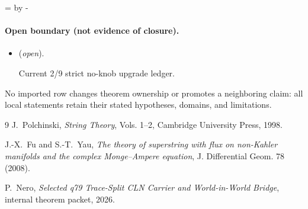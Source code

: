 \documentclass[11pt]{article}
\begin{document}
\par\begingroup{}=\pagegoal\advance{} by -\pagetotal\ifdim\dimen0<7\baselineskip\newpage\fi\endgroup
\paragraph{Open boundary (not evidence of closure).}
\begin{itemize}
\setlength{\itemsep}{0.25em}
\item {} (\emph{open}).\par Current 2/9 strict no-knob upgrade ledger.
\end{itemize}

No imported row changes theorem ownership or promotes a neighboring claim: all local statements retain their stated hypotheses, domains, and limitations.

\begin{thebibliography}{9}
J.~Polchinski, \emph{String Theory}, Vols. 1--2, Cambridge University Press,
1998.

J.-X.~Fu and S.-T.~Yau,
\emph{The theory of superstring with flux on non-Kahler manifolds and the
complex Monge--Ampere equation}, J. Differential Geom. 78 (2008).

P.~Nero, \emph{Selected q79 Trace-Split CLN Carrier and World-in-World
Bridge}, internal theorem packet, 2026.
\end{thebibliography}
\end{document}
